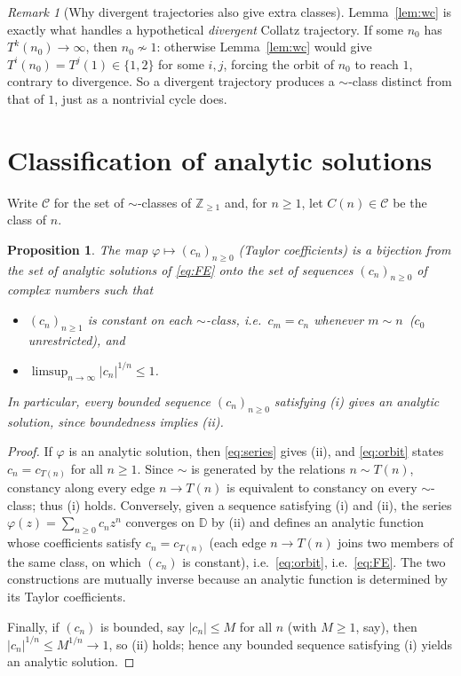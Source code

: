 \documentclass{amsart}
\newtheorem{proposition}{Proposition}
\theoremstyle{remark}
\newtheorem{remark}{Remark}
\begin{document}
\begin{remark}[Why divergent trajectories also give extra classes]
Lemma~\ref{lem:wc} is exactly what handles a hypothetical \emph{divergent} Collatz trajectory.
If some $n_0$ has $T^k(n_0)\to\infty$, then $n_0\not\sim 1$: otherwise Lemma~\ref{lem:wc} would
give $T^i(n_0)=T^j(1)\in\{1,2\}$ for some $i,j$, forcing the orbit of $n_0$ to reach $1$, contrary
to divergence. So a divergent trajectory produces a $\sim$-class distinct from that of $1$, just as
a nontrivial cycle does.
\end{remark}

\section{Classification of analytic solutions}

Write $\mathcal{C}$ for the set of $\sim$-classes of $\mathbb{Z}_{\ge1}$ and, for $n\ge1$, let
$C(n)\in\mathcal{C}$ be the class of $n$.

\begin{proposition}\label{prop:correspondence}
The map $\varphi\mapsto (c_n)_{n\ge0}$ (Taylor coefficients) is a bijection from the set of
analytic solutions of \eqref{eq:FE} onto the set of sequences $(c_n)_{n\ge0}$ of complex numbers
such that
\begin{itemize}
\item[(i)] $(c_n)_{n\ge1}$ is constant on each $\sim$-class, i.e.\ $c_m=c_n$ whenever
$m\sim n$ \,($c_0$ unrestricted), and
\item[(ii)] $\limsup_{n\to\infty}|c_n|^{1/n}\le1$.
\end{itemize}
In particular, \emph{every bounded} sequence $(c_n)_{n\ge0}$ satisfying (i) gives an analytic
solution, since boundedness implies (ii).
\end{proposition}
\begin{proof}
If $\varphi$ is an analytic solution, then \eqref{eq:series} gives (ii), and \eqref{eq:orbit}
states $c_n=c_{T(n)}$ for all $n\ge1$. Since $\sim$ is generated by the relations $n\sim T(n)$,
constancy along every edge $n\to T(n)$ is equivalent to constancy on every $\sim$-class; thus (i)
holds. Conversely, given a sequence satisfying (i) and (ii), the series
$\varphi(z)=\sum_{n\ge0}c_n z^n$ converges on $\mathbb{D}$ by (ii) and defines an analytic
function whose coefficients satisfy $c_n=c_{T(n)}$ (each edge $n\to T(n)$ joins two members of the
same class, on which $(c_n)$ is constant), i.e.\ \eqref{eq:orbit}, i.e.\ \eqref{eq:FE}. The two
constructions are mutually inverse because an analytic function is determined by its Taylor
coefficients.

Finally, if $(c_n)$ is bounded, say $|c_n|\le M$ for all $n$ (with $M\ge1$, say), then
$|c_n|^{1/n}\le M^{1/n}\to1$, so (ii) holds; hence any bounded sequence satisfying (i) yields an
analytic solution.
\end{proof}
\end{document}
